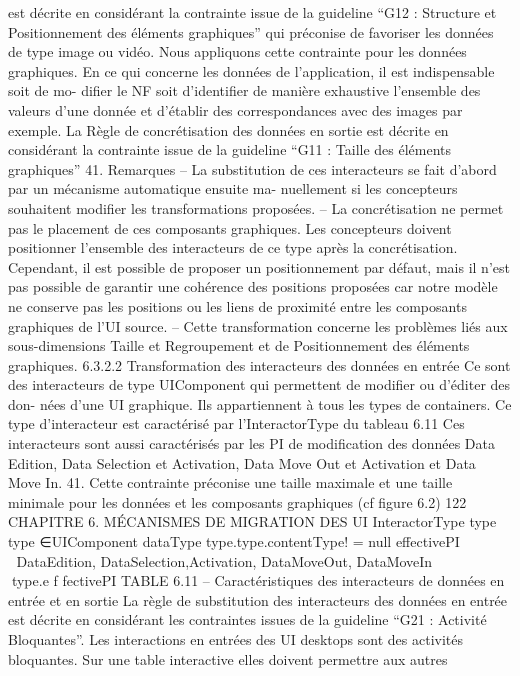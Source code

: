 \documentclass{article}
\begin{document}
est décrite en considérant la
contrainte issue de la guideline “G12 : Structure et Positionnement des éléments graphiques” qui
préconise de favoriser les données de type image ou vidéo. Nous appliquons cette contrainte pour les
données graphiques. En ce qui concerne les données de l’application, il est indispensable soit de mo-
diﬁer le NF soit d’identiﬁer de manière exhaustive l’ensemble des valeurs d’une donnée et d’établir
des correspondances avec des images par exemple.
La Règle de concrétisation des données en sortie
est décrite en considérant la contrainte issue de
la guideline “G11 : Taille des éléments graphiques” 41.
Remarques
– La substitution de ces interacteurs se fait d’abord par un mécanisme automatique ensuite ma-
nuellement si les concepteurs souhaitent modiﬁer les transformations proposées.
– La concrétisation ne permet pas le placement de ces composants graphiques. Les concepteurs
doivent positionner l’ensemble des interacteurs de ce type après la concrétisation. Cependant, il
est possible de proposer un positionnement par défaut, mais il n’est pas possible de garantir une
cohérence des positions proposées car notre modèle ne conserve pas les positions ou les liens
de proximité entre les composants graphiques de l’UI source.
– Cette transformation concerne les problèmes liés aux sous-dimensions Taille et Regroupement
et de Positionnement des éléments graphiques.
6.3.2.2
Transformation des interacteurs des données en entrée
Ce sont des interacteurs de type UIComponent qui permettent de modiﬁer ou d’éditer des don-
nées d’une UI graphique. Ils appartiennent à tous les types de containers. Ce type d’interacteur est
caractérisé par l’InteractorType du tableau 6.11
Ces interacteurs sont aussi caractérisés par les PI de modiﬁcation des données Data Edition, Data
Selection et Activation, Data Move Out et Activation et Data Move In.
41. Cette contrainte préconise une taille maximale et une taille minimale pour les données et les composants graphiques
(cf ﬁgure 6.2)
122
CHAPITRE 6. MÉCANISMES DE MIGRATION DES UI
InteractorType
type
type ∈{UIComponent}
dataType
type.type.contentType! = null
effectivePI







DataEdition,
DataSelection,Activation,
DataMoveOut,
DataMoveIn







⊂type.e f fectivePI
TABLE 6.11 – Caractéristiques des interacteurs de données en entrée et en sortie
La règle de substitution des interacteurs des données en entrée
est décrite en considérant les
contraintes issues de la guideline “G21 : Activité Bloquantes”. Les interactions en entrées des UI
desktops sont des activités bloquantes. Sur une table interactive elles doivent permettre aux autres
\end{document}
